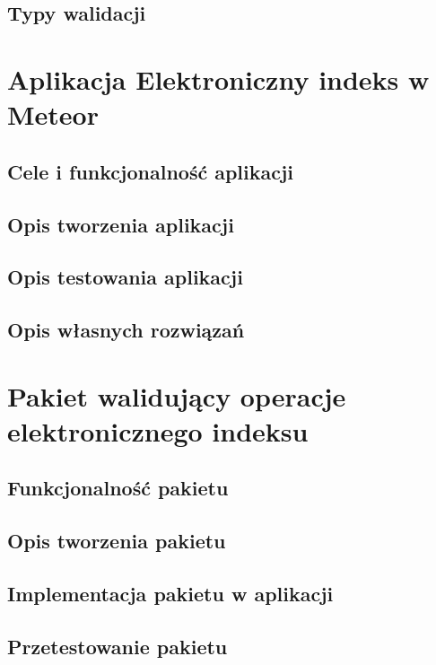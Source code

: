 \documentclass[brudnopis]{xmgr}
\begin{document}
\section{Typy walidacji}

\chapter{Aplikacja Elektroniczny indeks w Meteor}

\section{Cele i funkcjonalność aplikacji}
\section{Opis tworzenia aplikacji}
\cite{Introduction}
\cite{MeteorDocs}
\cite{DiscoverMeteor2013}
\cite{NodeDocs}
\cite{MongoDocs}
\cite{ScalingMongoDB2011}
\cite{ScalingWithMongoDB}
\section{Opis testowania aplikacji}
\cite{Laika}
\section{Opis własnych rozwiązań}


\chapter{Pakiet walidujący operacje elektronicznego indeksu}

\section{Funkcjonalność pakietu}
\section{Opis tworzenia pakietu}
\cite{Packages}
\cite{MeteorDocs}
\cite{DiscoverMeteor2013}
\section{Implementacja pakietu w aplikacji}
\section{Przetestowanie pakietu}
\cite{TinyTest}
\end{document}
